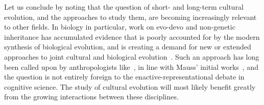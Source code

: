 \begin{new}

Let us conclude by noting that the question of short- and long-term cultural evolution, and the approaches to study them, are becoming increasingly relevant to other fields.
In biology in particular, work on evo-devo and non-genetic inheritance has accumulated evidence that is poorly accounted for by the modern synthesis of biological evolution, and is creating a demand for new or extended  approaches to joint cultural and biological evolution~\citep[see][for instance]{gilbert_eco-evo-devo:_2015}.
Such an approach has long been called upon by anthropologists like~\citet{ingold_beyond_2004,ingold_three_1999}, in line with Mauss' initial works~\citep{mauss_les_1936}, and the question is not entirely foreign to the enactive-representational debate in cognitive science.
The study of cultural evolution will most likely benefit greatly from the growing interactions between these disciplines.

\end{new}